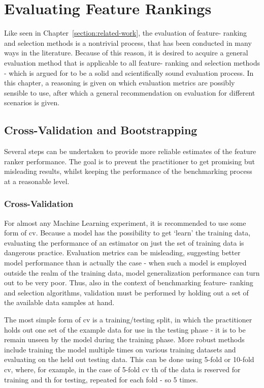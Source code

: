 \documentclass[../main.tex]{subfiles}
\begin{document}
\section{Evaluating Feature Rankings}\label{section:evaluation}
Like seen in Chapter~\ref{section:related-work}, the evaluation of feature- ranking and selection methods is a nontrivial process, that has been conducted in many ways in the literature. Because of this reason, it is desired to acquire a general evaluation method that is applicable to all feature- ranking and selection methods - which is argued for to be a solid and scientifically sound evaluation process. In this chapter, a reasoning is given on which evaluation metrics are possibly sensible to use, after which a general recommendation on evaluation for different scenarios is given.



\subsection{Cross-Validation and Bootstrapping}\label{section:cv}
Several steps can be undertaken to provide more reliable estimates of the feature ranker performance. The goal is to prevent the practitioner to get promising but misleading results, whilst keeping the performance of the benchmarking process at a reasonable level.



\subsubsection{Cross-Validation}
For almost any Machine Learning experiment, it is recommended to use some form of \gls{cv}. Because a model has the possibility to get `learn' the training data, evaluating the performance of an estimator on just the set of training data is dangerous practice. Evaluation metrics can be misleading, suggesting better model performance than is actually the case - when such a model is employed outside the realm of the training data, model generalization performance can turn out to be very poor. Thus, also in the context of benchmarking feature- ranking and selection algorithms, validation must be performed by holding out a set of the available data samples at hand.

The most simple form of \gls{cv} is a training/testing split, in which the practitioner holds out one set of the example data for use in the testing phase - it is to be remain unseen by the model during the training phase. More robust methods include training the model multiple times on various training datasets and evaluating on the held out testing data. This can be done using 5-fold or 10-fold \gls{cv}, where, for example, in the case of 5-fold \gls{cv} th of the data is reserved for training and th for testing, repeated for each fold - so 5 times.
\end{document}
